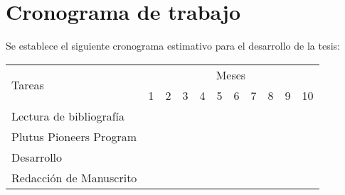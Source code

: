 \documentclass[12pt]{book}
\begin{document}






\section{Cronograma de trabajo}

Se establece el siguiente cronograma estimativo para el desarrollo de la tesis:

\bigskip

\begin{center}
\def\arraystretch{1.5}
\begin{tabular}{ |l|c|c|c|c|c|c|c|c|c|c| }

 \hline
 \multirow{2}{1em}{Tareas} & \multicolumn{10}{|c|}{Meses}\\  \cline{2-11} &
     1 & 2 & 3 & 4 & 5 & 6 & 7 & 8 & 9 & 10 \\  \hline
 Lectura de bibliografía & \cellcolor{gray} & \cellcolor{gray} &  &  & &  &  &  &  &   \\
 \hline
Plutus Pioneers Program &  & \cellcolor{gray} & \cellcolor{gray} &  &  &  & & &  &  \\
 \hline
Desarrollo &  &  & \cellcolor{gray} & \cellcolor{gray} & \cellcolor{gray} &  \cellcolor{gray} & \cellcolor{gray} & \cellcolor{gray} &  & \\
 \hline
Redacción de Manuscrito &  &  &  &  &  &  & & \cellcolor{gray} & \cellcolor{gray} & \cellcolor{gray}    \\
 \hline
\end{tabular}
\end{center}

\bigskip
\end{document}
